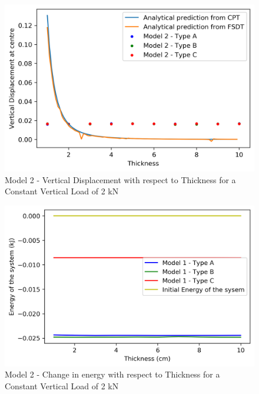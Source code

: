  
 \begin{figure}[!htbp]
     \centering
     \includegraphics{Figures/M2_t_plt.png}
     \caption{Model 2 - Vertical Displacement with respect to Thickness for a Constant Vertical Load of 2 kN}
     \label{fig:M2_t_plt}
 \end{figure}
 
 \begin{figure}[!htbp]
     \centering
     \includegraphics{Figures/M2_t_energy.png}
     \caption{Model 2 - Change in energy with respect to Thickness for a Constant Vertical Load of 2 kN}
     \label{fig:M2_t_energy}
 \end{figure}
 
